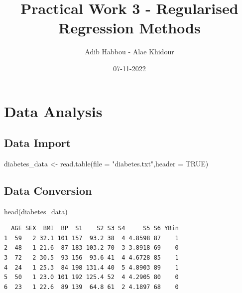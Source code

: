 \documentclass[
]{article}
\title{Practical Work 3 - Regularised Regression Methods}
\author{Adib Habbou - Alae Khidour}
\date{07-11-2022}
\newenvironment{Shaded}{\begin{snugshade}}{\end{snugshade}}
\newcommand{\AttributeTok}[1]{\textcolor[rgb]{0.77,0.63,0.00}{#1}}
\newcommand{\ConstantTok}[1]{\textcolor[rgb]{0.00,0.00,0.00}{#1}}
\newcommand{\DecValTok}[1]{\textcolor[rgb]{0.00,0.00,0.81}{#1}}
\newcommand{\FunctionTok}[1]{\textcolor[rgb]{0.00,0.00,0.00}{#1}}
\newcommand{\NormalTok}[1]{#1}
\newcommand{\OtherTok}[1]{\textcolor[rgb]{0.56,0.35,0.01}{#1}}
\newcommand{\SpecialCharTok}[1]{\textcolor[rgb]{0.00,0.00,0.00}{#1}}
\newcommand{\StringTok}[1]{\textcolor[rgb]{0.31,0.60,0.02}{#1}}
\begin{document}
\maketitle

\hypertarget{data-analysis}{%
\section{Data Analysis}\label{data-analysis}}

\hypertarget{data-import}{%
\subsection{Data Import}\label{data-import}}

\begin{Shaded}
\begin{Highlighting}[]
\NormalTok{diabetes\_data }\OtherTok{\textless{}{-}} \FunctionTok{read.table}\NormalTok{(}\AttributeTok{file =} \StringTok{"diabetes.txt"}\NormalTok{,}\AttributeTok{header =} \ConstantTok{TRUE}\NormalTok{)}
\end{Highlighting}
\end{Shaded}

\hypertarget{data-conversion}{%
\subsection{Data Conversion}\label{data-conversion}}

\begin{Shaded}
\end{Shaded}

\begin{Shaded}
\begin{Highlighting}[]
\FunctionTok{head}\NormalTok{(diabetes\_data)}
\end{Highlighting}
\end{Shaded}

\begin{verbatim}
  AGE SEX  BMI  BP  S1    S2 S3 S4     S5 S6 YBin
1  59   2 32.1 101 157  93.2 38  4 4.8598 87    1
2  48   1 21.6  87 183 103.2 70  3 3.8918 69    0
3  72   2 30.5  93 156  93.6 41  4 4.6728 85    1
4  24   1 25.3  84 198 131.4 40  5 4.8903 89    1
5  50   1 23.0 101 192 125.4 52  4 4.2905 80    0
6  23   1 22.6  89 139  64.8 61  2 4.1897 68    0
\end{verbatim}
\end{document}
